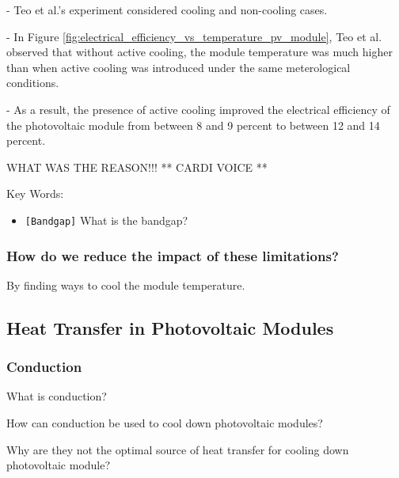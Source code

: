 \noindent - Teo et al.'s \cite{Teo2012AnModules} experiment considered cooling and non-cooling cases.\par
\noindent - In Figure \ref{fig:electrical_efficiency_vs_temperature_pv_module}, Teo et al. observed that without active cooling, the module temperature was much higher than when active cooling was introduced under the same meterological conditions.\par
\noindent - As a result, the presence of active cooling improved the electrical efficiency of the photovoltaic module from between 8 and 9 percent to between 12 and 14 percent.\vspace{1em}

\noindent WHAT WAS THE REASON!!! ** CARDI VOICE **\par
\noindent Key Words:\par
\begin{itemize}
    \item \texttt{[Bandgap]} What is the bandgap?
\end{itemize}


\subsubsection{How do we reduce the impact of these limitations?}
By finding ways to cool the module temperature.\par

\pagebreak
\subsection{Heat Transfer in Photovoltaic Modules}

\subsubsection{Conduction} %
\noindent What is conduction?\par
\noindent How can conduction be used to cool down photovoltaic modules?\par
\noindent Why are they not the optimal source of heat transfer for cooling down photovoltaic module?\par

